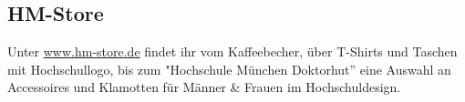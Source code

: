 \subsection{HM-Store}
Unter \url{www.hm-store.de} findet ihr vom Kaffeebecher, über T-Shirts und 
Taschen mit Hochschullogo, bis zum "Hochschule München Doktorhut''
eine Auswahl an Accessoires und Klamotten für Männer \& Frauen im 
Hochschuldesign.